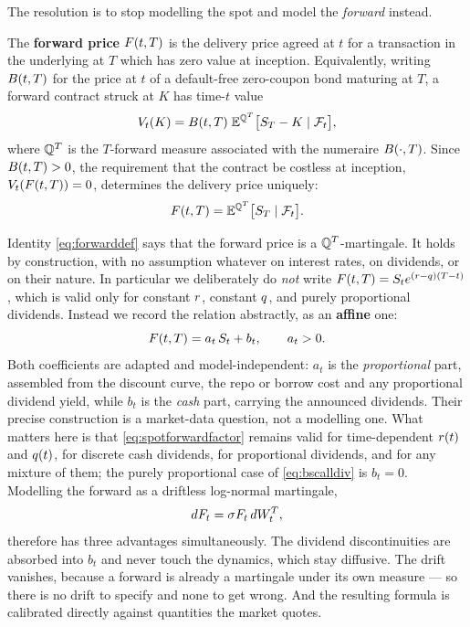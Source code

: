 The resolution is to stop modelling the spot and model the \emph{forward} instead.

\begin{definition}\label{def:forwardprice}
The \textbf{forward price} $F(t,T)$ is the delivery price agreed at $t$ for a transaction in the 
underlying at $T$ which has zero value at inception. Equivalently, writing $B(t,T)$ for the 
price at $t$ of a default-free zero-coupon bond maturing at $T$,
a forward contract struck at $K$ has time-$t$ value
\begin{equation}\label{eq:forwardvalue}
V_t(K) = B(t,T)\;\mathbb{E}^{\mathbb{Q}^{T}}\bigl[S_T - K \mid \mathcal{F}_t\bigr],
\end{equation}
where $\mathbb{Q}^{T}$ is the $T$-forward measure associated with the numeraire $B(\cdot,T)$. Since 
$B(t,T) > 0$, the requirement that the contract be costless at inception, $V_t(F(t,T)) = 0$, 
determines the delivery price uniquely:
\begin{equation}\label{eq:forwarddef}
F(t,T) = \mathbb{E}^{\mathbb{Q}^{T}}\bigl[S_T \mid \mathcal{F}_t\bigr].
\end{equation}
\end{definition}


Identity \eqref{eq:forwarddef} says that the forward price is a $\mathbb{Q}^{T}$-martingale. It holds by construction, with no assumption 
whatever on interest rates, on dividends, or on their nature. In particular we deliberately do 
\emph{not} write $F(t,T) = S_t e^{(r-q)(T-t)}$, which is valid only for constant $r$, 
constant $q$, and purely proportional dividends. Instead we record the relation abstractly, as an
\textbf{affine} one:
\begin{equation}\label{eq:spotforwardfactor}
F(t,T) = a_t\,S_t + b_t, \qquad a_t > 0.
\end{equation}
 Both coefficients are adapted and
model-independent: $a_t$ is the \emph{proportional} part, assembled from the discount curve, the repo
or borrow cost and any proportional dividend yield, while $b_t$ is the \emph{cash} part, carrying the
announced dividends. Their precise construction is a market-data question, not a modelling
one. What matters here is that \eqref{eq:spotforwardfactor} remains
valid for time-dependent $r(t)$ and $q(t)$, for discrete cash dividends, for proportional
dividends, and for any mixture of them; the purely proportional case of \eqref{eq:bscalldiv} is
$b_t = 0$. Modelling the forward as a driftless log-normal martingale,
\begin{equation}\label{eq:blackdynamics}
dF_t = \sigma F_t \, dW^{T}_t,
\end{equation}
therefore has three advantages simultaneously. The dividend discontinuities are absorbed into
$b_t$ and never touch the dynamics, which stay diffusive. The drift vanishes, because a forward 
is already a martingale under its own measure --- so there is no drift to specify and none to get 
wrong. And the resulting formula is calibrated directly against quantities the market quotes.

